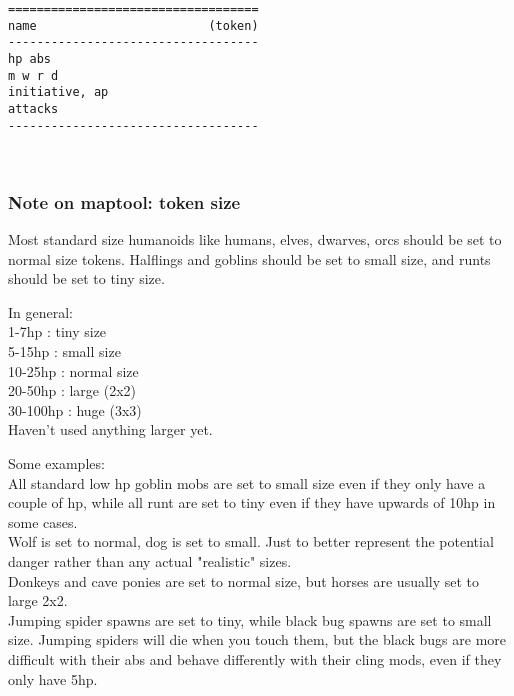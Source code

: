 \goodbreak \begin{samepage} \small \begin{verbatim}
===================================
name                        (token)
-----------------------------------
hp abs
m w r d
initiative, ap
attacks
-----------------------------------
\end{verbatim} \normalsize \end{samepage}

\

\flushbottom




\subsubsection*{Note on maptool: token size}
Most standard size humanoids like humans, elves, dwarves, orcs should be set to  normal size tokens. Halflings and goblins should be set to small size, and runts should be set to tiny size.

In general:\\
1-7hp : tiny size \\
5-15hp : small size \\
10-25hp : normal size \\
20-50hp : large (2x2) \\
30-100hp : huge (3x3) \\
Haven't used anything larger yet.

Some examples:\\
All standard low hp goblin mobs are set to small size even if they only have a couple of hp, while all runt are set to tiny even if they have upwards of 10hp in some cases.\\
Wolf is set to normal, dog is set to small. Just to better represent the potential danger rather than any actual "realistic" sizes.\\
Donkeys and cave ponies are set to normal size, but horses are usually set to large 2x2.\\
Jumping spider spawns are set to tiny, while black bug spawns are set to small size. Jumping spiders will die when you touch them, but the black bugs are more difficult with their abs and behave differently with their cling mods, even if they only have 5hp.

\






